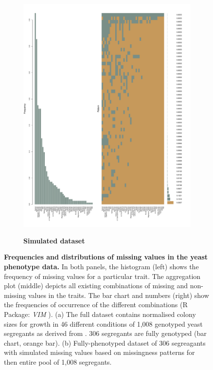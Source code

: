 \begin{figure}[!h]
\begin{subfigure}[b]{0.48\textwidth}
	\end{subfigure}
	~
	\begin{subfigure}[b]{0.48\textwidth}
		\center
	\includegraphics[trim = 0mm 0mm 20mm 2mm, clip, scale=0.2]{Chapter1/Figures/20170124_missing_data_pattern_simulated.pdf}\\
	\caption{\textbf{Simulated  dataset}}
 		\label{fig:missingness-sample}
	\end{subfigure}
	\caption[Frequencies and distributions of missing values in the yeast phenotype data]{\textbf{Frequencies and distributions of missing values in the yeast phenotype data.} In both panels, the histogram (left) shows the frequency of missing values for a particular trait. The aggregation plot (middle) depicts all existing combinations of missing and non-missing values in the traits. The bar chart and numbers (right) show the frequencies of occurrence of the different combinations (R Package: \emph{VIM} \citep{Templ2012}). (a) The full dataset contains normalised colony sizes for growth in 46 different conditions of 1,008 genotyped yeast segregants as derived from \citep{Bloom2013}. 306 segregants are fully genotyped (bar chart, orange bar). (b) Fully-phenotyped dataset of 306 segreagants with simulated missing values based on missingness patterns for then entire pool of 1,008 segregants.}
 	\label{fig:missingness}
\end{figure}

